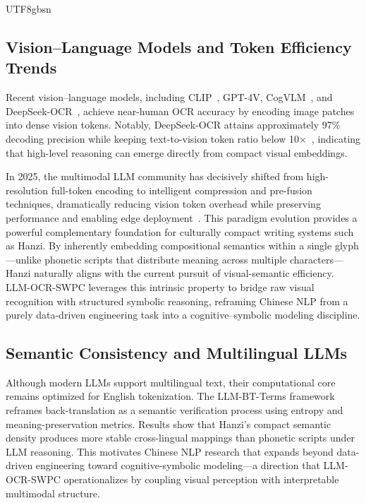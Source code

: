 \documentclass[conference]{IEEEtran}
\begin{document}
\begin{CJK*}{UTF8}{gbsn}
\subsection{Vision--Language Models and Token Efficiency Trends}

Recent vision--language models, including CLIP~\cite{radford2021learning}, GPT-4V, CogVLM~\cite{wang2024cogvlm}, and DeepSeek-OCR~\cite{wei2025deepseek}, achieve near-human OCR accuracy by encoding image patches into dense vision tokens. Notably, DeepSeek-OCR attains approximately 97\% decoding precision while keeping text-to-vision token ratio below 10×~\cite{wei2025deepseek}, indicating that high-level reasoning can emerge directly from compact visual embeddings.

In 2025, the multimodal LLM community has decisively shifted from high-resolution full-token encoding to intelligent compression and pre-fusion techniques, dramatically reducing vision token overhead while preserving performance and enabling edge deployment~\cite{zhang2025llava,lu2025internvl,bai2025qwen2}. This paradigm evolution provides a powerful complementary foundation for culturally compact writing systems such as Hanzi. By inherently embedding compositional semantics within a single glyph—unlike phonetic scripts that distribute meaning across multiple characters—Hanzi naturally aligns with the current pursuit of visual-semantic efficiency. LLM-OCR-SWPC leverages this intrinsic property to bridge raw visual recognition with structured symbolic reasoning, reframing Chinese NLP from a purely data-driven engineering task into a cognitive--symbolic modeling discipline.

\subsection{Semantic Consistency and Multilingual LLMs}
Although modern LLMs support multilingual text, their computational core remains optimized for English tokenization. The LLM-BT-Terms framework \cite{weigang2025paradox,weigang2025llm} reframes back-translation as a semantic verification process using entropy and meaning-preservation metrics. Results show that Hanzi’s compact semantic density produces more stable cross-lingual mappings than phonetic scripts under LLM reasoning. This motivates Chinese NLP research that expands beyond data-driven engineering toward cognitive-symbolic modeling---a direction that LLM-OCR-SWPC operationalizes by coupling visual perception with interpretable multimodal structure.




\end{CJK*}
\end{document}
